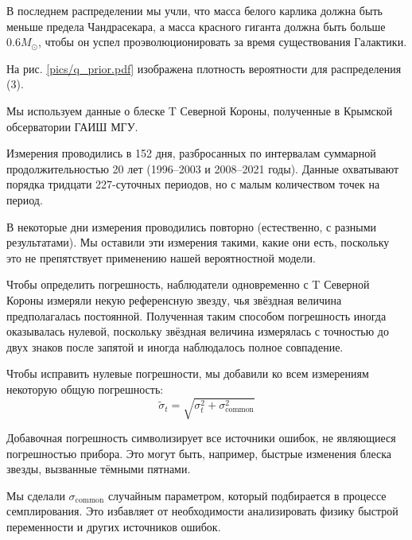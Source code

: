 В последнем распределении мы учли, что масса белого карлика должна быть меньше предела Чандрасекара, а масса красного гиганта должна быть больше $0.6 M_\odot$, чтобы он успел проэволюционировать за время существования Галактики.

На рис. \ref{pics/q_prior.pdf} изображена плотность вероятности для распределения (3).

\vspace{0.5em}








\label{sect:Brilliance}

Мы используем данные о блеске T Северной Короны, полученные в Крымской обсерватории ГАИШ МГУ.

Измерения проводились в 152 дня, разбросанных по интервалам суммарной продолжительностью 20 лет (1996--2003 и 2008--2021 годы). Данные охватывают порядка тридцати 227-суточных периодов, но с малым количеством точек на период.

В некоторые дни измерения проводились повторно (естественно, с разными результатами). Мы оставили эти измерения такими, какие они есть, поскольку это не препятствует применению нашей вероятностной модели.


Чтобы определить погрешность, наблюдатели одновременно с T Северной Короны измеряли некую референсную звезду, чья звёздная величина предполагалась постоянной. Полученная таким способом погрешность иногда оказывалась нулевой, поскольку звёздная величина измерялась с точностью до двух знаков после запятой и иногда наблюдалось полное совпадение.

Чтобы исправить нулевые погрешности, мы добавили ко всем измерениям некоторую общую погрешность:
\[
\tilde \sigma_t = \sqrt{\sigma_t^2 + \sigma_\text{common}^2}
\]

Добавочная погрешность символизирует все источники ошибок, не являющиеся погрешностью прибора. Это могут быть, например, быстрые изменения блеска звезды, вызванные тёмными пятнами.

Мы сделали $\sigma_\text{common}$ случайным параметром, который подбирается в процессе семплирования. Это избавляет от необходимости анализировать физику быстрой переменности и других источников ошибок.

